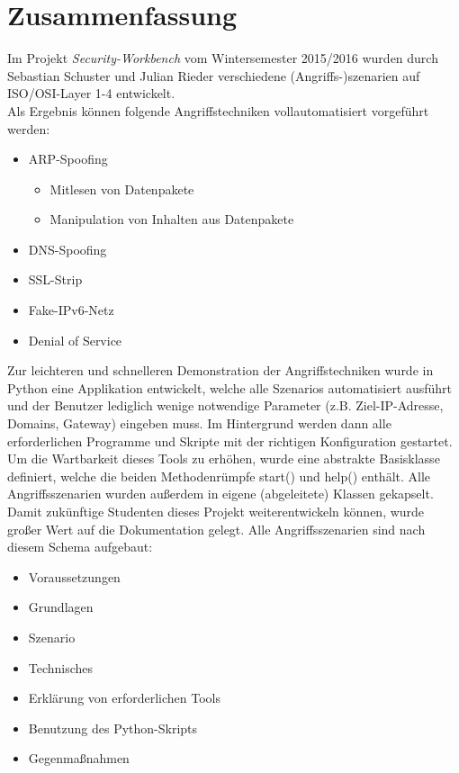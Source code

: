 \chapter{Zusammenfassung}

Im Projekt \textit{Security-Workbench} vom Wintersemester 2015/2016 wurden durch Sebastian Schuster und Julian Rieder verschiedene (Angriffs-)szenarien auf ISO/OSI-Layer 1-4 entwickelt.\\

Als Ergebnis können folgende Angriffstechniken vollautomatisiert vorgeführt werden:
\begin{itemize}
\item ARP-Spoofing
	\begin{itemize}
		\item Mitlesen von Datenpakete
		\item Manipulation von Inhalten aus Datenpakete
	\end{itemize}
\item DNS-Spoofing
\item SSL-Strip
\item Fake-IPv6-Netz
\item Denial of Service
\end{itemize}


Zur leichteren und schnelleren Demonstration der Angriffstechniken wurde in Python eine Applikation entwickelt, welche alle Szenarios automatisiert ausführt und der Benutzer lediglich wenige notwendige Parameter (z.B. Ziel-IP-Adresse, Domains, Gateway) eingeben muss. Im Hintergrund werden dann alle erforderlichen Programme und Skripte mit der richtigen Konfiguration gestartet.\\

Um die Wartbarkeit dieses Tools zu erhöhen, wurde eine abstrakte Basisklasse definiert, welche die beiden Methodenrümpfe start() und help() enthält. Alle Angriffsszenarien wurden
außerdem in eigene (abgeleitete) Klassen gekapselt. \\

Damit zukünftige Studenten dieses Projekt weiterentwickeln können, wurde großer Wert auf die Dokumentation gelegt. Alle Angriffsszenarien sind nach diesem
Schema aufgebaut:

\begin{itemize}
\item Voraussetzungen
\item Grundlagen
\item Szenario
\item Technisches
\item Erklärung von erforderlichen Tools
\item Benutzung des Python-Skripts
\item Gegenmaßnahmen
\end{itemize}
